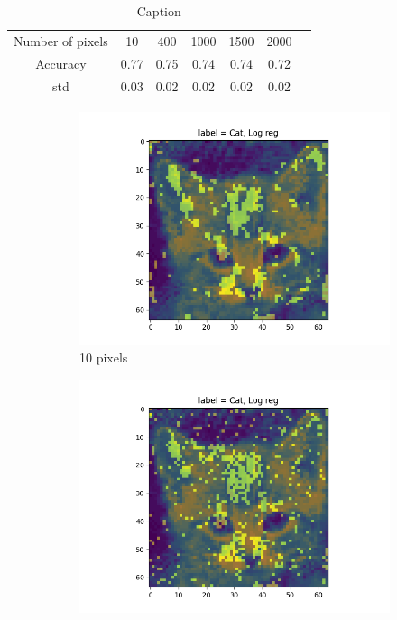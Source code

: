 \documentclass{article}
\begin{document}
\begin{table}[H]
    \centering
    \begin{tabular}{c|c|c|c|c|c|c}
        Number of pixels & 10 &  400  & 1000 & 1500 &2000  \\
        Accuracy & 0.77 & 0.75 & 0.74 & 0.74 & 0.72\\
        std & 0.03 & 0.02& 0.02 & 0.02 & 0.02\\
        
    \end{tabular}
    \caption{Caption}
    \label{pixel accuracy}
\end{table}
\begin{figure}[H]
\begin{subfigure}{.33\textwidth}
  \centering
  \includegraphics[width=1\linewidth]{2d/,10, Log reg.png}  
  \caption{10 pixels}
  \label{fig:sub-first}
\end{subfigure}
\begin{subfigure}{.33\textwidth}
  \centering
  \includegraphics[width=1\linewidth]{2d/,1000, Log reg.png}  

\end{subfigure}
\end{figure}
\end{document}
